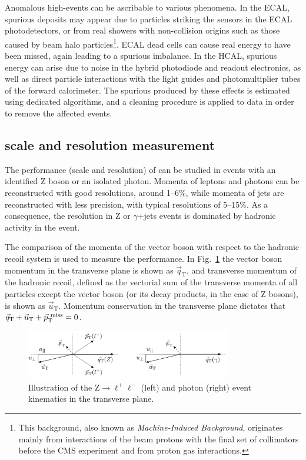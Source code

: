 Anomalous high-\MET events can be ascribable to various phenomena. In the ECAL, spurious deposits may appear due to particles striking the sensors in the ECAL photodetectors, or from real showers with non-collision origins such as those caused by beam halo particles\footnote{This background, also known as \emph{Machine-Induced Background}, originates mainly from interactions of the beam protons with the final set of collimators before the CMS experiment and from proton gas interactions.}. ECAL dead cells can cause real energy to have been missed, again leading to a spurious imbalance. In the HCAL, spurious energy can arise due to noise in the hybrid photodiode and readout electronics, as well as direct particle interactions with the light guides and photomultiplier tubes of the forward calorimeter. The spurious \MET produced by these effects is estimated using dedicated algorithms, and a cleaning procedure is applied to data in order to remove the affected events.

\subsection{\MET scale and resolution measurement}
The performance (scale and resolution) of \MET can be studied in events with an identified Z boson or an isolated photon. Momenta of leptons and photons can be reconstructed with good resolutions, around 1--6\%, while momenta of jets are reconstructed with less precision, with typical resolutions of 5--15\%. As a consequence, the \MET resolution in Z or $\gamma$+jets events is dominated by hadronic activity in the event.

The comparison of the momenta of the vector boson with respect to the hadronic recoil system is used to measure the \MET performance. In Fig.~\ref{fig:metZgamma} the vector boson momentum in the transverse plane is shown as $\vec{q}_\mathrm{T}$, and transverse momentum of the hadronic recoil, defined as the vectorial sum of the transverse momenta of all particles except the vector boson (or its decay products, in the
case of Z bosons), is shown as $\vec{u}_\mathrm{T}$. Momentum conservation in the transverse plane dictates that $\vec{q}_\mathrm{T} + \vec{u}_\mathrm{T} + \vec{p}_\mathrm{T}^\mathrm{~miss} = 0$.

\begin{figure}[htb]
\centering
\includegraphics[width=0.8\textwidth]{images/metZgamma.pdf}
\caption{Illustration of the Z$\to\ell^+\ell^-$ (left) and photon (right) event kinematics in the transverse plane.}\label{fig:metZgamma}
\end{figure}

